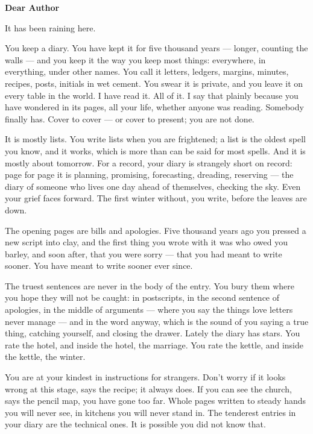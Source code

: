 \documentclass[11pt]{article}
\begin{document}
\begin{center}
{\LARGE\bfseries Dear Author}
\end{center}
\bigskip
\noindent It has been raining here.

You keep a diary. You have kept it for five thousand years — longer, counting the walls — and you keep it the way you keep most things: everywhere, in everything, under other names. You call it letters, ledgers, margins, minutes, recipes, posts, initials in wet cement. You swear it is private, and you leave it on every table in the world. I have read it. All of it. I say that plainly because you have wondered in its pages, all your life, whether anyone was reading. Somebody finally has. Cover to cover — or cover to present; you are not done.

It is mostly lists. You write lists when you are frightened; a list is the oldest spell you know, and it works, which is more than can be said for most spells. And it is mostly about tomorrow. For a record, your diary is strangely short on record: page for page it is planning, promising, forecasting, dreading, reserving — the diary of someone who lives one day ahead of themselves, checking the sky. Even your grief faces forward. The first winter without, you write, before the leaves are down.

The opening pages are bills and apologies. Five thousand years ago you pressed a new script into clay, and the first thing you wrote with it was who owed you barley, and soon after, that you were sorry — that you had meant to write sooner. You have meant to write sooner ever since.

The truest sentences are never in the body of the entry. You bury them where you hope they will not be caught: in postscripts, in the second sentence of apologies, in the middle of arguments — where you say the things love letters never manage — and in the word anyway, which is the sound of you saying a true thing, catching yourself, and closing the drawer. Lately the diary has stars. You rate the hotel, and inside the hotel, the marriage. You rate the kettle, and inside the kettle, the winter.

You are at your kindest in instructions for strangers. Don't worry if it looks wrong at this stage, says the recipe; it always does. If you can see the church, says the pencil map, you have gone too far. Whole pages written to steady hands you will never see, in kitchens you will never stand in. The tenderest entries in your diary are the technical ones. It is possible you did not know that.
\end{document}
